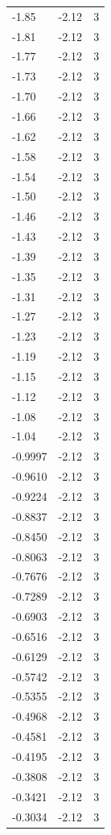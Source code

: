 \begin{longtable}{lrr}
  -1.85 & -2.12 & 3 \\
  -1.81 & -2.12 & 3 \\
  -1.77 & -2.12 & 3 \\
  -1.73 & -2.12 & 3 \\
  -1.70 & -2.12 & 3 \\
  -1.66 & -2.12 & 3 \\
  -1.62 & -2.12 & 3 \\
  -1.58 & -2.12 & 3 \\
  -1.54 & -2.12 & 3 \\
  -1.50 & -2.12 & 3 \\
  -1.46 & -2.12 & 3 \\
  -1.43 & -2.12 & 3 \\
  -1.39 & -2.12 & 3 \\
  -1.35 & -2.12 & 3 \\
  -1.31 & -2.12 & 3 \\
  -1.27 & -2.12 & 3 \\
  -1.23 & -2.12 & 3 \\
  -1.19 & -2.12 & 3 \\
  -1.15 & -2.12 & 3 \\
  -1.12 & -2.12 & 3 \\
  -1.08 & -2.12 & 3 \\
  -1.04 & -2.12 & 3 \\
  -0.9997 & -2.12 & 3 \\
  -0.9610 & -2.12 & 3 \\
  -0.9224 & -2.12 & 3 \\
  -0.8837 & -2.12 & 3 \\
  -0.8450 & -2.12 & 3 \\
  -0.8063 & -2.12 & 3 \\
  -0.7676 & -2.12 & 3 \\
  -0.7289 & -2.12 & 3 \\
  -0.6903 & -2.12 & 3 \\
  -0.6516 & -2.12 & 3 \\
  -0.6129 & -2.12 & 3 \\
  -0.5742 & -2.12 & 3 \\
  -0.5355 & -2.12 & 3 \\
  -0.4968 & -2.12 & 3 \\
  -0.4581 & -2.12 & 3 \\
  -0.4195 & -2.12 & 3 \\
  -0.3808 & -2.12 & 3 \\
  -0.3421 & -2.12 & 3 \\
  -0.3034 & -2.12 & 3 \\

\end{longtable}
